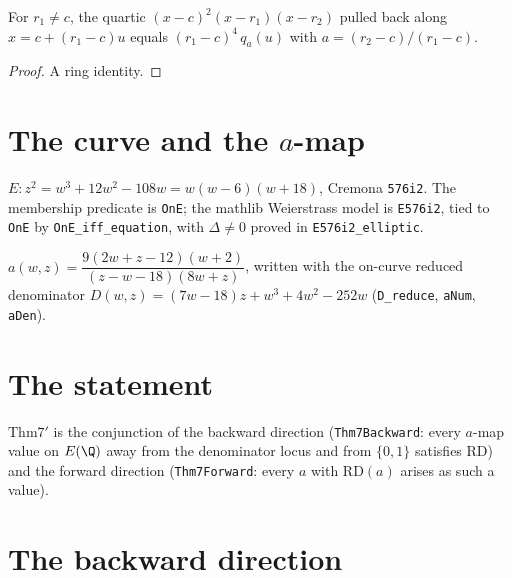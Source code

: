 \begin{lemma}
\label{lem:normalize}
\leanok
{}
For $r_1 \neq c$, the quartic $(x-c)^2(x-r_1)(x-r_2)$ pulled back along
$x = c + (r_1-c)u$ equals $(r_1-c)^4\, q_a(u)$ with
$a = (r_2-c)/(r_1-c)$.
\end{lemma}
\begin{proof}\leanok
A ring identity.
\end{proof}

\section{The curve and the $a$-map}

\begin{definition}\label{def:E}
\leanok
$E\colon z^2 = w^3+12w^2-108w = w(w-6)(w+18)$, Cremona \texttt{576i2}.
The membership predicate is \texttt{OnE}; the mathlib Weierstrass model
is \texttt{E576i2}, tied to \texttt{OnE} by
\texttt{OnE\_iff\_equation}, with $\Delta \neq 0$ proved in
\texttt{E576i2\_elliptic}.
\end{definition}

\begin{definition}\label{def:amap}
\leanok
{}
$a(w,z) = \dfrac{9(2w+z-12)(w+2)}{(z-w-18)(8w+z)}$, written with the
on-curve reduced denominator
$D(w,z) = (7w-18)z + w^3+4w^2-252w$ (\texttt{D\_reduce},
\texttt{aNum}, \texttt{aDen}).
\end{definition}

\section{The statement}

\begin{definition}\label{def:thm7prime}
\leanok
{}
$\mathrm{Thm7'}$ is the conjunction of the backward direction
(\texttt{Thm7Backward}: every $a$-map value on $E(\Q)$ away from the
denominator locus and from $\{0,1\}$ satisfies $\mathrm{RD}$) and the
forward direction (\texttt{Thm7Forward}: every $a$ with $\mathrm{RD}(a)$
arises as such a value).
\end{definition}

\section{The backward direction}

